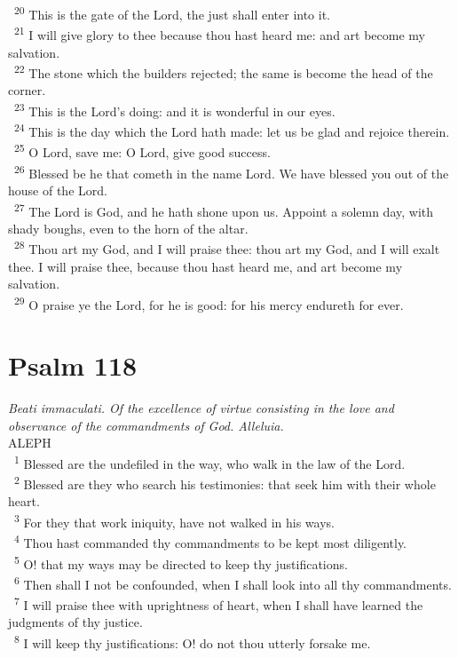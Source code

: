 \documentclass[a5paper,12pt]{article}
\begin{document}
\begin{multicols*}{2}
~\textsuperscript{20} This is the gate of the Lord, the just shall enter into it.\\
~\textsuperscript{21} I will give glory to thee because thou hast heard me: and art become my salvation.\\
~\textsuperscript{22} The stone which the builders rejected; the same is become the head of the corner.\\
~\textsuperscript{23} This is the Lord's doing: and it is wonderful in our eyes.\\
~\textsuperscript{24} This is the day which the Lord hath made: let us be glad and rejoice therein.\\
~\textsuperscript{25} O Lord, save me: O Lord, give good success.\\
~\textsuperscript{26} Blessed be he that cometh in the name Lord. We have blessed you out of the house of the Lord.\\
~\textsuperscript{27} The Lord is God, and he hath shone upon us. Appoint a solemn day, with shady boughs, even to the horn of the altar.\\
~\textsuperscript{28} Thou art my God, and I will praise thee: thou art my God, and I will exalt thee. I will praise thee, because thou hast heard me, and art become my salvation.\\
~\textsuperscript{29} O praise ye the Lord, for he is good: for his mercy endureth for ever.\\

\section{Psalm 118}
\label{sec:orgc89af0a}
\emph{Beati immaculati. Of the excellence of virtue consisting in the love and observance of the commandments of God. Alleluia.}\\

ALEPH\\

~\textsuperscript{1} Blessed are the undefiled in the way, who walk in the law of the Lord.\\
~\textsuperscript{2} Blessed are they who search his testimonies: that seek him with their whole heart.\\
~\textsuperscript{3} For they that work iniquity, have not walked in his ways.\\
~\textsuperscript{4} Thou hast commanded thy commandments to be kept most diligently.\\
~\textsuperscript{5} O! that my ways may be directed to keep thy justifications.\\
~\textsuperscript{6} Then shall I not be confounded, when I shall look into all thy commandments.\\
~\textsuperscript{7} I will praise thee with uprightness of heart, when I shall have learned the judgments of thy justice.\\
~\textsuperscript{8} I will keep thy justifications: O! do not thou utterly forsake me.\\


\end{multicols*}
\end{document}
